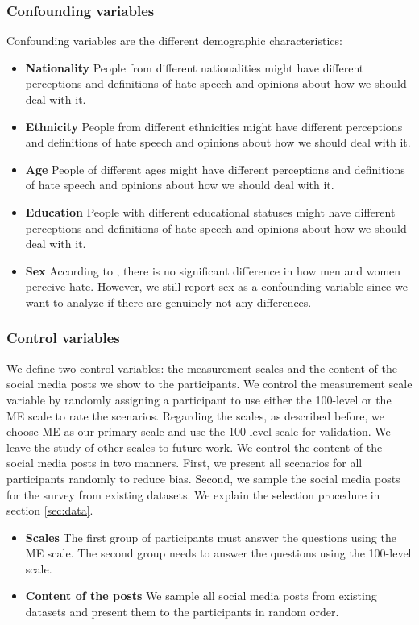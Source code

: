 \subsubsection{Confounding variables}
\label{sec:survey-confounding-variables}
%
Confounding variables are the different demographic characteristics:
%
\begin{itemize}
    \item \textbf{Nationality} People from different nationalities might have different perceptions and definitions of hate speech and opinions about how we should deal with it.
    \item \textbf{Ethnicity} People from different ethnicities might have different perceptions and definitions of hate speech and opinions about how we should deal with it.
    \item \textbf{Age} People of different ages might have different perceptions and definitions of hate speech and opinions about how we should deal with it.
    \item \textbf{Education} People with different educational statuses might have different perceptions and definitions of hate speech and opinions about how we should deal with it.
    \item \textbf{Sex} According to \citet{gold2018women}, there is no significant difference in how men and women perceive hate. However, we still report sex as a confounding variable since we want to analyze if there are genuinely not any differences.
\end{itemize}

\subsubsection{Control variables}
%
We define two control variables: the measurement scales and the content of the social media posts we show to the participants.
%
We control the measurement scale variable by randomly assigning a participant to use either the 100-level or the ME scale to rate the scenarios.
%
Regarding the scales, as described before, we choose ME as our primary scale and use the 100-level scale for validation.
%
We leave the study of other scales to future work.
%
We control the content of the social media posts in two manners.
%
First, we present all scenarios for all participants randomly to reduce bias.
%
Second, we sample the social media posts for the survey from existing datasets.
% 
We explain the selection procedure in section \ref{sec:data}.
%
\begin{itemize}
    \item \textbf{Scales} The first group of participants must answer the questions using the ME scale. The second group needs to answer the questions using the 100-level scale.
    \item \textbf{Content of the posts} We sample all social media posts from existing datasets and present them to the participants in random order.
\end{itemize}

